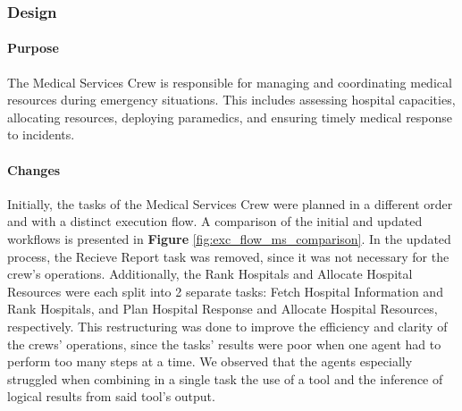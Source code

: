 \subsubsection{Design}
\paragraph{Purpose}
The Medical Services Crew is responsible for managing and coordinating medical resources during emergency situations. This includes assessing hospital capacities, allocating resources, deploying paramedics, and ensuring timely medical response to incidents.

\paragraph{Changes}
Initially, the tasks of the Medical Services Crew were planned in a different order and with a distinct execution flow. A comparison of the initial and updated workflows is presented in \textbf{Figure} \ref{fig:exc_flow_ms_comparison}. In the updated process, the Recieve Report task was removed, since it was not necessary for the crew's operations. Additionally, the Rank Hospitals and Allocate Hospital Resources were each split into 2 separate tasks: Fetch Hospital Information and Rank Hospitals, and Plan Hospital Response and Allocate Hospital Resources, respectively. This restructuring was done to improve the efficiency and clarity of the crews' operations, since the tasks' results were poor when one agent had to perform too many steps at a time. We observed that the agents especially struggled when combining in a single task the use of a tool and the inference of logical results from said tool's output.


